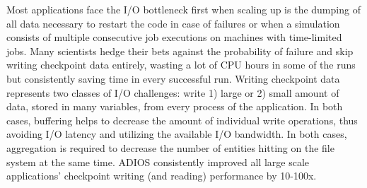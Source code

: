 Most applications face the I/O bottleneck first when scaling up is the dumping of all data necessary to restart the code in case of failures or when a simulation consists of multiple consecutive job executions on machines with time-limited jobs. Many scientists hedge their bets against the probability of failure and skip writing checkpoint data entirely, wasting a lot of CPU hours in some of the runs but consistently saving time in every successful run. Writing checkpoint data represents two classes of I/O challenges: write 1) large or 2) small amount of data, stored in many variables, from every process of the application. In both cases, buffering helps to decrease the amount of individual write operations, thus avoiding I/O latency and utilizing the available I/O bandwidth. In both cases, aggregation is required to decrease the number of entities hitting on the file system at the same time. ADIOS consistently improved all large scale applications' checkpoint writing (and reading) performance by 10-100x.


